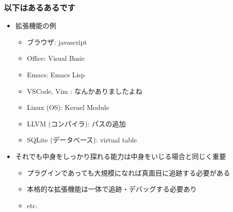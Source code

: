 \documentclass[12pt,dvipdfmx]{beamer}
\begin{document}
\begin{frame}
\frametitle{以下はあるあるです}
\begin{itemize}
\item 拡張機能の例
  \begin{itemize}
  \item ブラウザ: javascript
  \item Office: Visual Basic
  \item Emacs: Emacs Lisp
  \item VSCode, Vim : なんかありましたよね
  \item Linux (OS): Kernel Module
  \item LLVM (コンパイラ): パスの追加
  \item SQLite (データベース): virtual table
  \end{itemize}

\item それでも中身をしっかり探れる能力は中身をいじる場合と同じく重要
  \begin{itemize}
  \item プラグインであっても大規模になれば真面目に追跡する必要がある
  \item 本格的な拡張機能は一体で追跡・デバッグする必要あり
  \item etc.
  \end{itemize}
\end{itemize}
\end{frame}

\iffalse
\begin{frame}
\frametitle{いろいろないじり方・作り方}
\begin{itemize}

\item ちなみに，実際にソースコードに手を出さな
  くてはいけないケースは，意外と少ない

\item というよりも，人に使わせるにはいじらず済ませられたほうがよい

  \begin{itemize}
    \item 拡張機能を利用(LLVMパス, SQLite virtual table, 
      Linux OS kernel module, \ldots)
    \item コマンドとして利用
  \end{itemize}

\item それでも中身をしっかり探れる能力は中身をいじる場合と同じく重要
  \begin{itemize}
  \item 本格的な拡張機能は一体でデバッグする必要あり
  \item ファイル形式
  \item ドキュメント化されていない機能
  \item etc.
  \end{itemize}
\end{itemize}
\end{frame}
\fi
\end{document}
